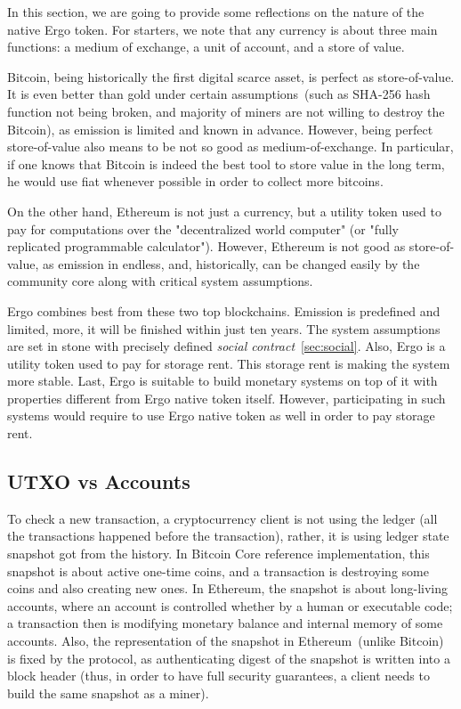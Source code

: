  In this section, we are going to provide some reflections on the nature of the native Ergo token. For starters, we note that
 any currency is about three main functions: a medium of exchange, a unit of account, and a store of value.

 Bitcoin, being historically the first digital scarce asset, is perfect as store-of-value. It is even better than
 gold under certain assumptions~(such as SHA-256 hash function not being broken, and majority of miners are not willing
 to destroy the Bitcoin), as emission is limited and known in advance. However, being perfect store-of-value also means
 to be not so good as medium-of-exchange. In particular, if one knows that Bitcoin is indeed the best tool to store
 value in the long term, he would use fiat whenever possible in order to collect more bitcoins.

 On the other hand, Ethereum is not just a currency, but a utility token used to pay for computations over the
 "decentralized world computer" (or "fully replicated programmable calculator"). However, Ethereum is not good as
 store-of-value, as emission in endless, and, historically, can be changed easily by the community core along with
 critical system assumptions.

 Ergo combines best from these two top blockchains. Emission is predefined and limited, more, it will be finished within
 just ten years. The system assumptions are set in stone with precisely defined {\em social contract}~\ref{sec:social}. Also,
 Ergo is a utility token used to pay for storage rent. This storage rent is making the system more stable. Last, Ergo is
 suitable to build monetary systems on top of it with properties different from Ergo native token itself. However,
 participating in such systems would require to use Ergo native token as well in order to pay storage rent.

\subsection{UTXO vs Accounts}
 \label{sec:utxo}


 To check a new transaction, a cryptocurrency client is not using the ledger (all the transactions happened before the
 transaction), rather, it is using ledger state snapshot got from the history. In Bitcoin Core reference implementation,
 this snapshot is about active one-time coins, and a transaction is destroying some coins and also creating new ones.
 In Ethereum, the snapshot is about long-living accounts, where an account is controlled whether by a human or
 executable code; a transaction then is modifying monetary balance and internal memory of some accounts. Also, the
 representation of the snapshot in Ethereum~(unlike Bitcoin) is fixed by the protocol, as authenticating digest of the
 snapshot is written into a block header (thus, in order to have full security guarantees, a client needs to build
 the same snapshot as a miner).


